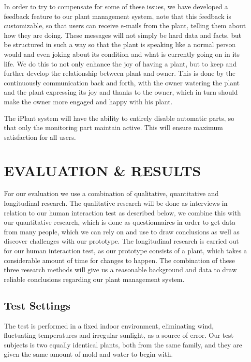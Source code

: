 \documentclass{ubicomp2012}
\begin{document}
In order to try to compensate for some of these issues, we have developed a feedback feature to our plant management system, note that this feedback is customizable, so that users can receive e-mails from the plant, telling them about how they are doing. These messages will not simply be hard data and facts, but be structured in such a way so that the plant is speaking like a normal person would and even joking about its condition and what is currently going on in its life.
We do this to not only enhance the joy of having a plant, but to keep and further develop the relationship between plant and owner. This is done by the continuously communication back and forth, with the owner watering the plant and the plant expressing its joy and thanks to the owner, which in turn should make the owner more engaged and happy with his plant.

The iPlant system will have the ability to entirely disable automatic parts, so that only the monitoring part maintain active. This will ensure maximum satisfaction for all users.

\section{EVALUATION \& RESULTS}
For our evaluation we use a combination of qualitative, quantitative and longitudinal \cite{longitudinal} research.
The qualitative research will be done as interviews in relation to our human interaction test as described below, we combine this with our quantitative research, which is done as questionnaires in order to get data from many people, which we can rely on and use to draw conclusions as well as discover challenges with our prototype. The longitudinal research is carried out for our human interaction test, as our prototype consists of a plant, which takes a considerable amount of time for changes to happen. The combination of these three research methods will give us a reasonable background and data to draw reliable conclusions regarding our plant management system.

\subsection{Test Settings}
The test is performed in a fixed indoor environment, eliminating wind, fluctuating temperatures and irregular sunlight, as a source of error. 
Our test subjects is two equally identical plants, both from the same family, and they are given the same amount of mold and water to begin with.
\end{document}
